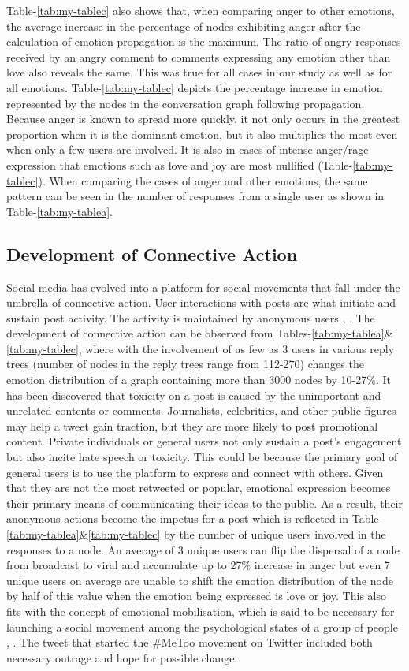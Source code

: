 \documentclass[acmtog]{acmart}
\begin{document}
Table-\ref{tab:my-tablec} also shows that, when comparing anger to other emotions, the average increase in the percentage of nodes exhibiting anger after the calculation of emotion propagation is the maximum. The ratio of angry responses received by an angry comment to comments expressing any emotion other than love also reveals the same. This was true for all cases in our study as well as for all emotions. Table-\ref{tab:my-tablec} depicts the percentage increase in emotion represented by the nodes in the conversation graph following propagation. Because anger is known to spread more quickly, it not only occurs in the greatest proportion when it is the dominant emotion, but it also multiplies the most even when only a few users are involved. It is also in cases of intense anger/rage expression that emotions such as love and joy are most nullified (Table-\ref{tab:my-tablec}). When comparing the cases of anger and other emotions, the same pattern can be seen in the number of responses from a single user as shown in Table-\ref{tab:my-tablea}. 
\subsection{Development of Connective Action}
Social media has evolved into a platform for social movements that fall under the umbrella of connective action. User interactions with posts are what initiate and sustain post activity. The activity is maintained by anonymous users \cite{mirbabaie2021development}, \cite{saveski2021structure}. The development of connective action can be observed from Tables-\ref{tab:my-tablea}\&\ref{tab:my-tablec}, where with the involvement of as few as 3 users in various reply trees (number of nodes in the reply trees range from 112-270) changes the emotion distribution of a graph containing more than 3000 nodes by 10-27\%. It has been discovered that toxicity on a post is caused by the unimportant and unrelated contents or comments. Journalists, celebrities, and other public figures may help a tweet gain traction, but they are more likely to post promotional content. Private individuals or general users not only sustain a post's engagement but also incite hate speech or toxicity. This could be because the primary goal of general users is to use the platform to express and connect with others. Given that they are not the most retweeted or popular, emotional expression becomes their primary means of communicating their ideas to the public. As a result, their anonymous actions become the impetus for a post which is reflected in Table-\ref{tab:my-tablea}\&\ref{tab:my-tablec} by the number of unique users involved in the responses to a node. An average of 3 unique users can flip the dispersal of a node from broadcast to viral and accumulate up to 27\% increase in anger but even 7 unique users on average are unable to shift the emotion distribution of the node by half of this value when the emotion being expressed is love or joy. This also fits with the concept of emotional mobilisation, which is said to be necessary for launching a social movement among the psychological states of a group of people \cite{castells2015networks}, \cite{saveski2021structure}. The tweet that started the \#MeToo movement on Twitter included both necessary outrage and hope for possible change.
\end{document}
